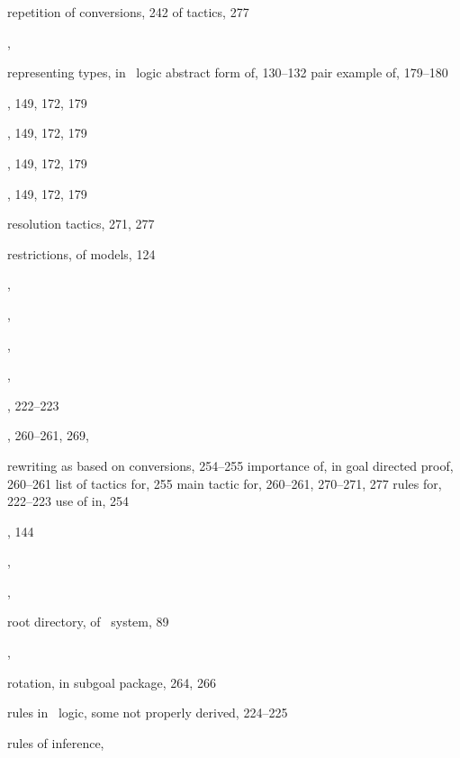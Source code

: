 \begin{theindex}
  \item repetition
    \subitem of conversions, 242
    \subitem of tactics, 277
  \item {}, 
  \item representing types, in \HOL\ logic
    \subitem abstract form of, 130--132
    \subitem pair example of, 179--180
  \item {}, 149, 172, 179
  \item {}, 149, 172, 179
  \item {}, 149, 172, 179
  \item {}, 149, 172, 179
  \item resolution tactics, 271, 277
  \item restrictions, of models, 124
  \item {}, 
  \item {}, 
  \item {}, 
  \item {}, 
  \item {}, 222--223
  \item {}, 260--261, 269, 
  \item rewriting
    \subitem as based on conversions, 254--255
    \subitem importance of, in goal directed proof, 260--261
    \subitem list of tactics for, 255
    \subitem main tactic for, 260--261, 270--271, 277
    \subitem rules for, 222--223
    \subitem use of  in, 254
  \item {}, 144
  \item {}, 
  \item {}, 
  \item root directory, of \HOL\ system, 89
  \item {}, 
  \item rotation, in subgoal package, 264, 266
  \item rules in \HOL\ logic, some not properly derived, 224--225
  \item rules of inference, 

  \indexspace


\end{theindex}
